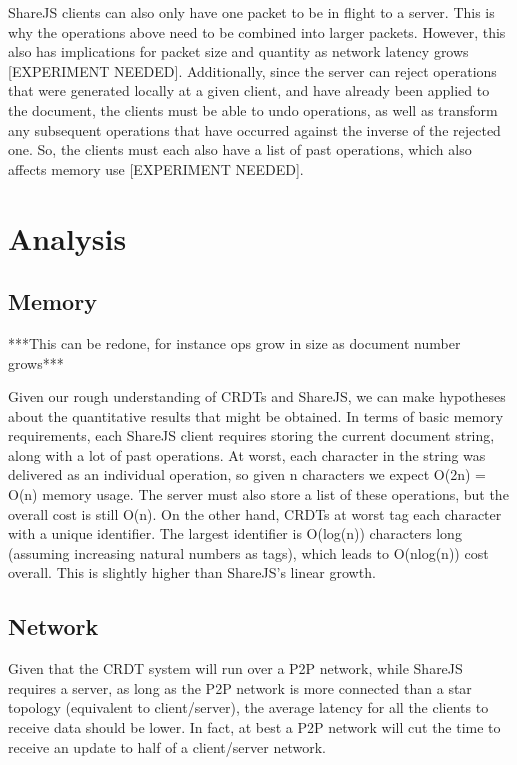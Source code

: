 \documentclass[12pt,a4paper,twoside,openright]{report}
\begin{document}
	ShareJS clients can also only have one packet to be in flight to a server. This is why the operations above need to be combined into larger packets. However, this also has implications for packet size and quantity as network latency grows [EXPERIMENT NEEDED]. Additionally, since the server can reject operations that were generated locally at a given client, and have already been applied to the document, the clients must be able to undo operations, as well as transform any subsequent operations that have occurred against the inverse of the rejected one. So, the clients must each also have a list of past operations, which also affects memory use [EXPERIMENT NEEDED].

	
\section{Analysis}
	
	\subsection{Memory}
	
	***This can be redone, for instance ops grow in size as document number grows***
	
	Given our rough understanding of CRDTs and ShareJS, we can make hypotheses about the quantitative results that might be obtained. In terms of basic memory requirements, each ShareJS client requires storing the current document string, along with a lot of past operations. At worst, each character in the string was delivered as an individual operation, so given n characters we expect O(2n) = O(n) memory usage. The server must also store a list of these operations, but the overall cost is still O(n). On the other hand, CRDTs at worst tag each character with a unique identifier. The largest identifier is O(log(n)) characters long (assuming increasing natural numbers as tags), which leads to O(nlog(n)) cost overall. This is slightly higher than ShareJS's linear growth.
	
	\subsection{Network}
	
	Given that the CRDT system will run over a P2P network, while ShareJS requires a server, as long as the P2P network is more connected than a star topology (equivalent to client/server), the average latency for all the clients to receive data should be lower. In fact, at best a P2P network will cut the time to receive an update to half of a client/server network. 
	
\end{document}
